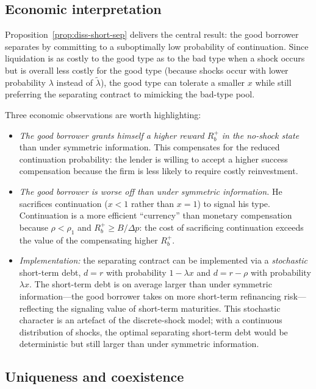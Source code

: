 \documentclass[11pt,a4paper,oneside]{book}
\def\geq{\geqslant}
\theoremstyle{plain}
\theoremstyle{definition}
\theoremstyle{remark}
\numberwithin{equation}{chapter}
\begin{document}
\subsection{Economic interpretation}

Proposition~\ref{prop:diss-short-sep} delivers the central result: the good borrower separates by committing to a suboptimally low probability of continuation.
Since liquidation is as costly to the good type as to the bad type when a shock occurs but is overall less costly for the good type (because shocks occur with lower probability $\lambda$ instead of $\widetilde{\lambda}$), the good type can tolerate a smaller $x$ while still preferring the separating contract to mimicking the bad-type pool.

Three economic observations are worth highlighting:

\begin{itemize}
  \item \emph{The good borrower grants himself a higher reward $R_b^+$ in the no-shock state} than under symmetric information.
  This compensates for the reduced continuation probability: the lender is willing to accept a higher success compensation because the firm is less likely to require costly reinvestment.
  \item \emph{The good borrower is worse off than under symmetric information.}
  He sacrifices continuation ($x < 1$ rather than $x = 1$) to signal his type.
  Continuation is a more efficient ``currency'' than monetary compensation because $\rho < \rho_1$ and $R_b^+ \geq B/\Delta p$: the cost of sacrificing continuation exceeds the value of the compensating higher $R_b^+$.
  \item \emph{Implementation:} the separating contract can be implemented via a \emph{stochastic} short-term debt, $d = r$ with probability $1 - \lambda x$ and $d = r - \rho$ with probability $\lambda x$.
  The short-term debt is on average larger than under symmetric information---the good borrower takes on more short-term refinancing risk---reflecting the signaling value of short-term maturities.
  This stochastic character is an artefact of the discrete-shock model; with a continuous distribution of shocks, the optimal separating short-term debt would be deterministic but still larger than under symmetric information.
\end{itemize}

\subsection{Uniqueness and coexistence}
\end{document}
